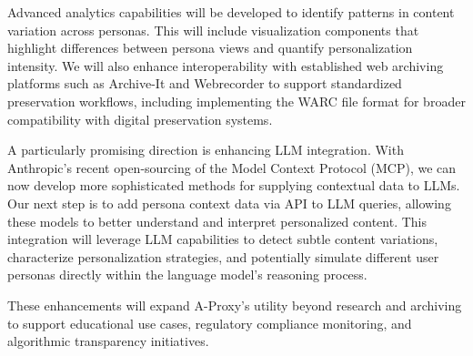 \documentclass[sigconf]{acmart}
\begin{document}
Advanced analytics capabilities will be developed to identify patterns in content variation across personas. This will include visualization components that highlight differences between persona views and quantify personalization intensity. We will also enhance interoperability with established web archiving platforms such as Archive-It and Webrecorder to support standardized preservation workflows, including implementing the WARC file format for broader compatibility with digital preservation systems.

A particularly promising direction is enhancing LLM integration. With Anthropic's recent open-sourcing of the Model Context Protocol (MCP), we can now develop more sophisticated methods for supplying contextual data to LLMs. Our next step is to add persona context data via API to LLM queries, allowing these models to better understand and interpret personalized content. This integration will leverage LLM capabilities to detect subtle content variations, characterize personalization strategies, and potentially simulate different user personas directly within the language model's reasoning process.

These enhancements will expand A-Proxy's utility beyond research and archiving to support educational use cases, regulatory compliance monitoring, and algorithmic transparency initiatives.



\end{document}
